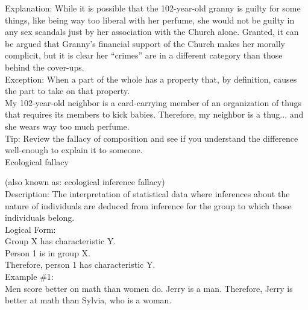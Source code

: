 \documentclass[a4paper,12pt,single,pdftex]{scrartcl}
\begin{document}
    
      Explanation: While it is possible that the 102-year-old granny is guilty for some things, like being way too liberal with her perfume, she would not be guilty in any sex scandals just by her association with the Church alone. Granted, it can be argued that Granny’s financial support of the Church makes her morally complicit, but it is clear her “crimes” are in a different category than those behind the cover-ups.
    \\

    
      Exception: When a part of the whole has a property that, by definition, causes the part to take on that property.
    \\

    
      My 102-year-old neighbor is a card-carrying member of an organization of thugs that requires its members to kick babies.  Therefore, my neighbor is a thug... and she wears way too much perfume.
    \\

    
      Tip: Review the fallacy of composition and see if you understand the difference well-enough to explain it to someone.
    \\

  

Ecological fallacy
    
      (also known as: ecological inference fallacy)
    \\

  
    
      Description: The interpretation of statistical data where inferences about the nature of individuals are deduced from inference for the group to which those individuals belong.
    \\

    
      Logical Form:
    \\

    
      Group X has characteristic Y.
    \\

    
      Person 1 is in group X.
    \\

    
      Therefore, person 1 has characteristic Y.
    \\

    
      Example \#1:
    \\

    
      Men score better on math than women do. Jerry is a man. Therefore, Jerry is better at math than Sylvia, who is a woman.
    \\
\end{document}
